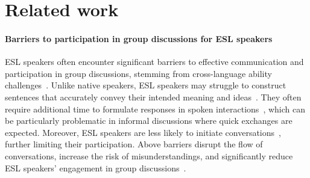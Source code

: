 \section{Related work}
\label{sec:related-work}


\paragraph{Barriers to participation in group discussions for ESL speakers}  


ESL speakers often encounter significant barriers to effective communication and participation in group discussions, stemming from cross-language ability challenges~\cite{higuchi2023impact}. Unlike native speakers, ESL speakers may struggle to construct sentences that accurately convey their intended meaning and ideas~\cite{turnbull2015effects, hessel2017new}. They often require additional time to formulate responses in spoken interactions~\cite{lam2006gauging}, which can be particularly problematic in informal discussions where quick exchanges are expected. Moreover, ESL speakers are less likely to initiate conversations~\cite{tan2020influence}, further limiting their participation. Above barriers disrupt the flow of conversations, increase the risk of misunderstandings, and significantly reduce ESL speakers' engagement in group discussions~\cite{sampson2024emergence,gao2024listenership}.


